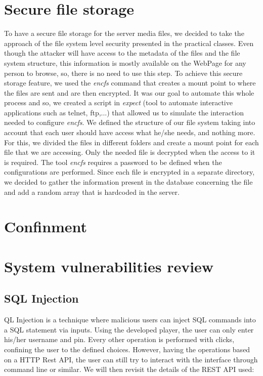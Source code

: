 \documentclass[11pt,a4paper]{report}
\begin{document}
\chapter{Secure file storage}
To have a secure file storage for the server media files, we decided to take the approach of the file system level security presented in the practical classes. Even though the attacker will have access to the metadata of the files and the file system structure, this information is mostly available on the WebPage for any person to browse, so, there is no need to use this step.
\newline
To achieve this secure storage feature, we used the \emph{encfs} command that creates a mount point to where the files are sent and are then encrypted.
\newline
It was our goal to automate this whole process and so, we created a script in \emph{expect} (tool to automate interactive applications such as telnet, ftp,...) that allowed us to simulate the interaction needed to configure \emph{encfs}.
\newline
We defined the structure of our file system taking into account that each user should have access what he/she needs, and nothing more.
\newline
For this, we divided the files in different folders and create a mount point for each file that we are accessing. Only the needed file is decrypted when the access to it is required.
\newline
The tool \emph{encfs} requires a password to be defined when the configurations are performed. Since each file is encrypted in a separate directory, we decided to gather the information present in the database concerning the file and add a random array that is hardcoded in the server.


\chapter{Confinment}

\chapter{System vulnerabilities review}
\section{SQL Injection}
QL Injection is a technique where malicious users can inject SQL commands into a SQL statement via inputs.
\newline
Using the developed player, the user can only enter his/her username and pin. Every other operation is performed with clicks, confining the user to the defined choices.
\newline
However, having the operations based on a HTTP Rest API, the user can still try to interact with the interface through command line or similar. We will then revisit the details of the REST API used:
\end{document}
